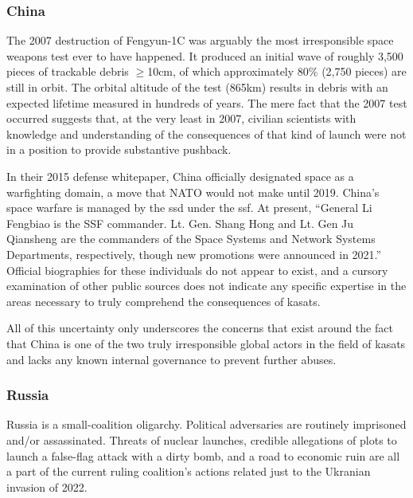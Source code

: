 \subsubsection{China}

The 2007 destruction of Fengyun-1C was arguably the most irresponsible
space weapons test ever to have happened.  It produced an initial wave
of roughly 3,500 pieces of trackable debris $\ge$10cm, of which
approximately 80\% (2,750 pieces) are still in
orbit.\cite[p05-01]{brian} The orbital altitude of the test (865km)
results in debris with an expected lifetime measured in hundreds of
years.\cite[fig from SpaceX]{rando-orbit} The mere fact that the 2007
test occurred suggests that, at the very least in 2007, civilian
scientists with knowledge and understanding of the consequences of
that kind of launch were not in a position to provide substantive
pushback.

In their 2015 defense whitepaper\cite{china-debutant}, China
officially designated space as a warfighting domain, a move that NATO
would not make until 2019.\cite{nato-likes-space} China's space
warfare is managed by the \ac{ssd} under the
\ac{ssf}.\cite[p65]{osd-china-21} At present, ``General Li Fengbiao is
the SSF commander. Lt. Gen. Shang Hong and Lt. Gen Ju Qiansheng are
the commanders of the Space Systems and Network Systems Departments,
respectively, though new promotions were announced in 2021.''
\cite[p65]{osd-china-21} Official biographies for these individuals do
not appear to exist, and a cursory examination of other public sources
does not indicate any specific expertise in the areas necessary to
truly comprehend the consequences of \acp{kasat}.

All of this uncertainty only underscores the concerns that exist
around the fact that China is one of the two truly irresponsible
global actors in the field of \acp{kasat} and lacks any known internal
governance to prevent further abuses.


\subsubsection{Russia}

Russia is a small-coalition oligarchy.\cite[russian-gov-primer]{xxx}
Political adversaries are routinely imprisoned and/or
assassinated.\cite{navalny}\cite{polonium} Threats of nuclear
launches, credible allegations of plots to launch a false-flag attack
with a dirty bomb, and a road to economic ruin are all a part of the
current ruling coalition's actions related just to the Ukranian
invasion of
2022.\cite{false-flag}\cite{russian-economy}\cite{putin-compensating}

